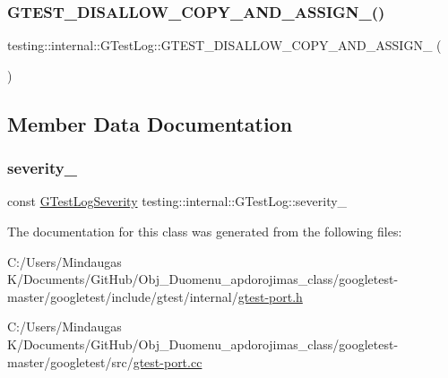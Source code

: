 \mbox{\label{classtesting_1_1internal_1_1_g_test_log_ab6032a126d36a80163fdcd406fce3aad}} 
\subsubsection{\texorpdfstring{GTEST\_DISALLOW\_COPY\_AND\_ASSIGN\_()}{GTEST\_DISALLOW\_COPY\_AND\_ASSIGN\_()}\hspace{0.1cm}{\footnotesize\ttfamily [3/3]}}
{\footnotesize\ttfamily testing\+::internal\+::\+G\+Test\+Log\+::\+G\+T\+E\+S\+T\+\_\+\+D\+I\+S\+A\+L\+L\+O\+W\+\_\+\+C\+O\+P\+Y\+\_\+\+A\+N\+D\+\_\+\+A\+S\+S\+I\+G\+N\+\_\+ (\begin{DoxyParamCaption}\item[{\mbox{\hyperlink{classtesting_1_1internal_1_1_g_test_log}{G\+Test\+Log}}}]{ }\end{DoxyParamCaption})\hspace{0.3cm}{\ttfamily [private]}}



\subsection{Member Data Documentation}
\mbox{\label{classtesting_1_1internal_1_1_g_test_log_ad8f75f5845900d0d2fd3cbb048a861be}} 
\subsubsection{\texorpdfstring{severity\_}{severity\_}}
{\footnotesize\ttfamily const \mbox{\hyperlink{namespacetesting_1_1internal_aa6255ef3b023c5b4e1a2198d887fb977}{G\+Test\+Log\+Severity}} testing\+::internal\+::\+G\+Test\+Log\+::severity\+\_\+\hspace{0.3cm}{\ttfamily [private]}}



The documentation for this class was generated from the following files\+:\begin{DoxyCompactItemize}
\item 
C\+:/\+Users/\+Mindaugas K/\+Documents/\+Git\+Hub/\+Obj\+\_\+\+Duomenu\+\_\+apdorojimas\+\_\+class/googletest-\/master/googletest/include/gtest/internal/\mbox{\hyperlink{googletest-master_2googletest_2include_2gtest_2internal_2gtest-port_8h}{gtest-\/port.\+h}}\item 
C\+:/\+Users/\+Mindaugas K/\+Documents/\+Git\+Hub/\+Obj\+\_\+\+Duomenu\+\_\+apdorojimas\+\_\+class/googletest-\/master/googletest/src/\mbox{\hyperlink{googletest-master_2googletest_2src_2gtest-port_8cc}{gtest-\/port.\+cc}}\end{DoxyCompactItemize}
